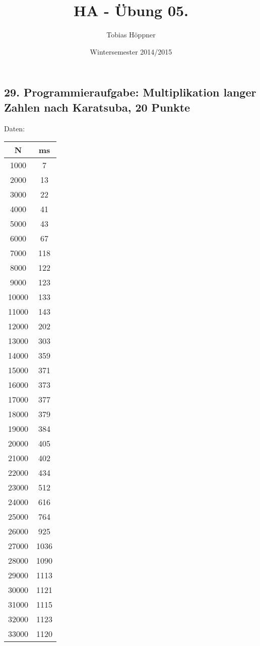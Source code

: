 \documentclass[ngerman,a4paper]{report}
\author{Tobias Höppner}
\title{HA - Übung 05.}
\date{Wintersemester 2014/2015}
\renewcommand{\maketitle}{}
\begin{document}
 
\maketitle 

\subsection*{29. Programmieraufgabe: Multiplikation langer Zahlen nach Karatsuba, 20 Punkte}
Daten:
\begin{tabular}{|c|c|}
\hline
N & ms\\
\hline
1000 & 7\\
\hline
2000 & 13\\
\hline
3000 & 22\\
\hline
4000 & 41\\
\hline
5000 & 43\\
\hline
6000 & 67\\
\hline
7000 & 118\\
\hline
8000 & 122\\
\hline
9000 & 123\\
\hline
10000 & 133\\
\hline
11000 & 143\\
\hline
12000 & 202\\
\hline
13000 & 303\\
\hline
14000 & 359\\
\hline
15000 & 371\\
\hline
16000 & 373\\
\hline
17000 & 377\\
\hline
18000 & 379\\
\hline
19000 & 384\\
\hline
20000 & 405\\
\hline
21000 & 402\\
\hline
22000 & 434\\
\hline
23000 & 512\\
\hline
24000 & 616\\
\hline
25000 & 764\\
\hline
26000 & 925\\
\hline
27000 & 1036\\
\hline
28000 & 1090\\
\hline
29000 & 1113\\
\hline
30000 & 1121\\
\hline
31000 & 1115\\
\hline
32000 & 1123\\
\hline
33000 & 1120\\
\hline

\end{tabular}
\end{document}

